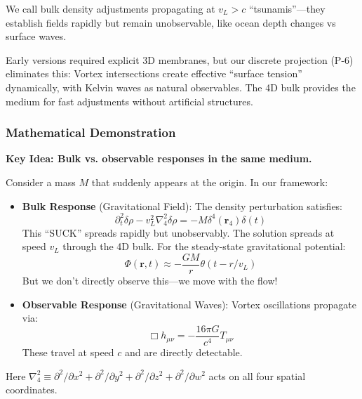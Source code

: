 We call bulk density adjustments propagating at $v_L > c$ ``tsunamis''---they establish fields rapidly but remain unobservable, like ocean depth changes vs surface waves.

\begin{tcolorbox}[title=Why Two Speeds Without Membranes]
Early versions required explicit 3D membranes, but our discrete projection (P-6) eliminates this: Vortex intersections create effective ``surface tension'' dynamically, with Kelvin waves as natural observables. The 4D bulk provides the medium for fast adjustments without artificial structures.
\end{tcolorbox}

\subsubsection{Mathematical Demonstration}

\textbf{Key Idea: Bulk vs. observable responses in the same medium.}

Consider a mass $M$ that suddenly appears at the origin. In our framework:

\begin{itemize}
\item \textbf{Bulk Response} (Gravitational Field): The density perturbation satisfies:
\begin{equation}
\partial_t^2 \delta\rho - v_L^2 \nabla_4^2 \delta\rho = -M\delta^4(\mathbf{r}_4)\delta(t)
\end{equation}
This ``SUCK'' spreads rapidly but unobservably. The solution spreads at speed $v_L$ through the 4D bulk. For the steady-state gravitational potential:
\begin{equation}
\Phi(\mathbf{r},t) \approx -\frac{GM}{r} \theta(t - r/v_L)
\end{equation}
But we don't directly observe this---we move with the flow!

\item \textbf{Observable Response} (Gravitational Waves): Vortex oscillations propagate via:
\begin{equation}
\Box h_{\mu\nu} = -\frac{16\pi G}{c^4} T_{\mu\nu}
\end{equation}
These travel at speed $c$ and are directly detectable.
\end{itemize}

Here $\nabla_4^2 \equiv \partial^2/\partial x^2 + \partial^2/\partial y^2 + \partial^2/\partial z^2 + \partial^2/\partial w^2$ acts on all four spatial coordinates.

